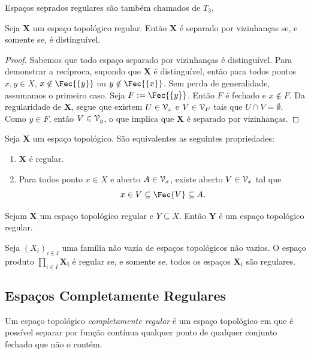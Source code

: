 Espaços seprados regulares são também chamados de $T_3$.

\begin{prop}
Seja $\bm X$ um espaço topológico regular. Então $\bm X$ é separado por vizinhanças se, e somente se, é distinguível.
\end{prop}
\begin{proof}
Sabemos que todo espaço separado por vizinhanças é distinguível. Para demonstrar a recíproca, supondo que $\bm X$ é distinguível, então para todos pontos $x,y \in X$, $x \notin \Fec{\{y\}}$ ou $y \notin \Fec{\{x\}}$. Sem perda de generalidade, assumamos o primeiro caso. Seja $F := \Fec{\{y\}}$. Então $F$ é fechado e $x \notin F$. Da regularidade de $\bm X$, segue que existem $U \in \mathcal{V}_x$ e $V \in \mathcal{V}_{F}$ tais que $U \cap V = \emptyset$. Como $y \in F$, então $V \in \mathcal{V}_y$, o que implica que $\bm X$ é separado por vizinhanças.
\end{proof}

\begin{prop}
Seja $\bm X$ um espaço topológico. São equivalentes as seguintes propriedades:
	\begin{enumerate}
	\item $\bm X$ é regular.
	\item Para todos ponto $x \in X$ e aberto $A \in \mathcal{V}_x$, existe aberto $V \in \mathcal{V}_x$ tal que
		\begin{equation*}
		x \in V \subseteq \Fec{V} \subseteq A.
		\end{equation*}
	\end{enumerate}
\end{prop}

\begin{prop}
Sejam $\bm X$ um espaço topológico regular e $Y \subseteq X$. Então $\bm Y$ é um espaço topológico regular.
\end{prop}

\begin{prop}
Seja $(X_i)_{i \in I}$ uma família não vazia de espaços topológicos não vazios. O espaço produto $\prod_{i \in I} \bm{X_i}$ é regular se, e somente se, todos os espaços $\bm X_i$ são regulares.
\end{prop}

\subsection{Espaços Completamente Regulares}

\begin{defi}
Um espaço topológico \emph{completamente regular} é um espaço topológico
em que é possível separar por função contínua qualquer ponto de qualquer conjunto fechado que não o contém.
\end{defi}

